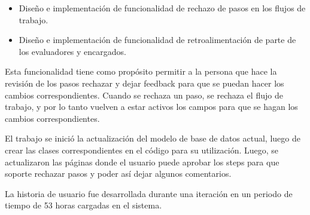 \begin{itemize}
	\item Diseño e implementación de funcionalidad de rechazo de pasos en los flujos de trabajo.
	\item Diseño e implementación de funcionalidad de retroalimentación de parte de los evaluadores y encargados.
\end{itemize}

Esta funcionalidad tiene como propósito permitir a la persona que hace la revisión de los pasos rechazar y dejar feedback para que se puedan hacer los cambios correspondientes. Cuando se rechaza un paso, se rechaza el flujo de trabajo, y por lo tanto vuelven a estar activos los campos para que se hagan los cambios correspondientes.

El trabajo se inició la actualización del modelo de base de datos actual, luego de crear las clases correspondientes en el código para su utilización. Luego, se actualizaron las páginas donde el usuario puede aprobar los steps para que soporte rechazar pasos y poder así dejar algunos comentarios. 

La historia de usuario fue desarrollada durante una iteración en un periodo de tiempo de 53 horas cargadas en el sistema.
